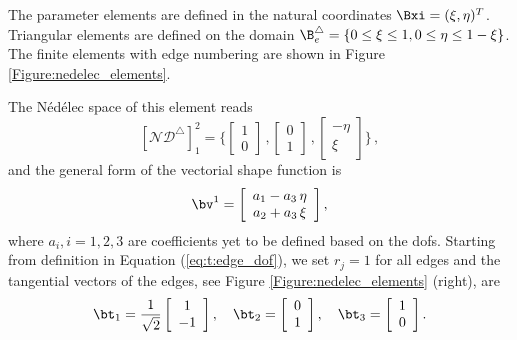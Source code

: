 \label{app:Nedelec_shape_functions}
\setcounter{equation}{0}
The parameter elements are defined in the natural coordinates $\Bxi = (\xi,\eta)^T$. Triangular elements are defined on the domain $\B_e^\triangle = \{0 \le \xi \le 1, 0 \le \eta \le 1 - \xi\}$.  The finite elements with edge numbering are shown in Figure  \ref{Figure:nedelec_elements}.

\label{sec:app:nt1}
The  N\'ed\'elec space of this element reads 
 \begin{equation}
  \left[ \mathcal{ND}^\triangle \right]^{2}_1 = \bigg\{ \left[ \begin{array}{c}
1 \\
0  
  \end{array} \right] \,, \left[ \begin{array}{c}
0 \\
1
  \end{array} \right]  \,, \left[ \begin{array}{c}
- \eta \\
\xi
  \end{array} \right]  \bigg\}\,,
 \end{equation}
 and the general form of the vectorial shape function is  
 \begin{equation}
 \label{eq:app:gf1}
 \bv^1  = \left[\begin{array}{c}
a_1 - a_3 \, \eta \\ 
a_2 + a_3 \, \xi
\end{array}\right],
\end{equation}
where $a_i, i=1,2,3$ are coefficients yet to be defined based on the dofs. Starting from definition in Equation (\ref{eq:t:edge_dof}), we set $r_j =1$ for all edges and the tangential vectors of the edges, see Figure \ref{Figure:nedelec_elements} (right), are 
\begin{equation}
\bt_1  = \frac{1}{\sqrt{2}}\left[ \begin{array}{c}
1 \\
-1 \\
\end{array} \right], \quad \bt_2  = \left[ \begin{array}{c}
0 \\
1 \\
\end{array} \right], \quad \bt_3  =
\left[ \begin{array}{c}
1 \\
0 \\
\end{array} \right].
\end{equation}
